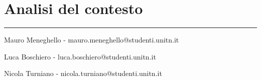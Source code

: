 \documentclass[a4paper,12pt]{article}
\begin{document}
\section*{Analisi del contesto}



\vspace{0.5cm}
\hrule
\vspace{0.5cm}


Mauro Meneghello - mauro.meneghello@studenti.unitn.it

Luca Boschiero -  luca.boschiero@studenti.unitn.it

Nicola Turniano - nicola.turniano@studenti.unitn.it

 
\end{document}
